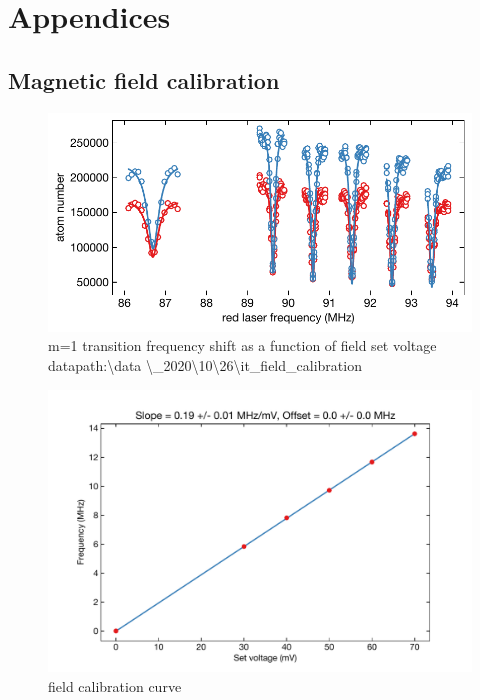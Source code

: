 \section{Appendices}
\label{sec:appendices}
\subsection{Magnetic field calibration}
		
		\begin{figure}[h]
		    \centering
		    \includegraphics[scale=0.8]{figures/field_calibration.pdf}
		    \caption{\TPO m=1 transition frequency shift as a function of field set voltage datapath:\textbackslash data \textbackslash\_2020\textbackslash10\textbackslash26\textbackslash it\_field\_calibration}
		    \label{fig:field_calibration}
		\end{figure}

		\begin{figure}
		    \centering
		    \includegraphics[scale=0.8]{figures/field_calib_curve.pdf}
		    \caption{field calibration curve}
		    \label{fig:field_calib_curve}
		\end{figure}

